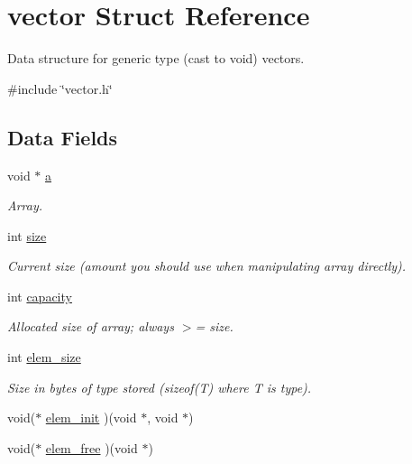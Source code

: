 \hypertarget{structvector}{
\section{vector Struct Reference}
\label{structvector}
}


Data structure for generic type (cast to void) vectors.  




{\ttfamily \#include \char`\"{}vector.h\char`\"{}}

\subsection*{Data Fields}
\begin{DoxyCompactItemize}
\item 
void $\ast$ \hyperlink{structvector_ab7be2d9a85f6fa18178475cf04f04024}{a}
\begin{DoxyCompactList}\small\item\em Array. \item\end{DoxyCompactList}\item 
int \hyperlink{structvector_a211c6f9096b87e1ff8b09ad5ad373e61}{size}
\begin{DoxyCompactList}\small\item\em Current size (amount you should use when manipulating array directly). \item\end{DoxyCompactList}\item 
int \hyperlink{structvector_a95bc684a8044cfc0e509861448908bf2}{capacity}
\begin{DoxyCompactList}\small\item\em Allocated size of array; always $>$= size. \item\end{DoxyCompactList}\item 
int \hyperlink{structvector_a1e2d06aaea690d5420fc153fa9b8c2b8}{elem\_\-size}
\begin{DoxyCompactList}\small\item\em Size in bytes of type stored (sizeof(T) where T is type). \item\end{DoxyCompactList}\item 
void($\ast$ \hyperlink{structvector_a9aa1b736be034d1734173299ba7874e2}{elem\_\-init} )(void $\ast$, void $\ast$)
\item 
void($\ast$ \hyperlink{structvector_aa707fd886c386fe365b6d6dbadb49733}{elem\_\-free} )(void $\ast$)
\end{DoxyCompactItemize}


